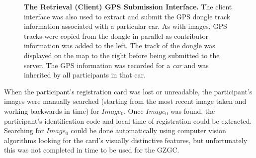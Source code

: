 \begin{figure}[t]%
    \centering
        \caption[The Retrieval (Client) GPS Submission Interface]{\textbf{The Retrieval (Client) GPS Submission Interface.}  The client interface was also used to extract and submit the GPS dongle track information associated with a particular car.  As with images, GPS tracks were copied from the dongle in parallel as contributor information was added to the left.  The track of the dongle was displayed on the map to the right before being submitted to the server.  The GPS information was recorded for a \textit{car} and was inherited by all participants in that car.}
        \label{fig:client-gps}
\end{figure}

When the participant's registration card was lost or unreadable, the participant's images were manually searched (starting from the most recent image taken and working backwards in time) for $Image_0$.  Once $Image_0$ was found, the participant's identification code and local time of registration could be extracted.  Searching for $Image_0$ could be done automatically using computer vision algorithms looking for the card's visually distinctive features, but unfortunately this was not completed in time to be used for the GZGC.

